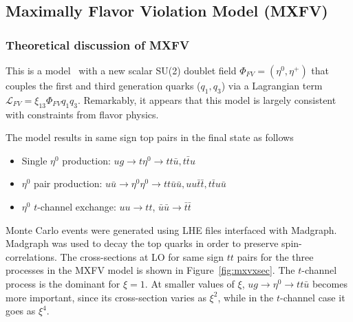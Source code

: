 



\subsection{Maximally Flavor Violation Model (MXFV)}
\label{sec:mxfv}

\subsubsection{Theoretical discussion of MXFV}
\label{sec:mxfvtheory}

This is a model~\cite{mxflv1,mxflv2,mxflv3} with a new scalar 
SU(2) doublet field $\Phi_{FV} = (\eta^0,\eta^+)$ that couples the first and third 
generation quarks ($q_1,q_3$) via a Lagrangian term 
$\mathcal{L}_{FV} = \xi_{13} \Phi_{FV} q_1 q_3$.  Remarkably, it appears that this
model is largely consistent with constraints from flavor physics.

The model results in same sign top pairs in the final state as follows
\begin{itemize}

\item Single $\eta^0$ production: $ug \to t\eta^0 \to tt\bar{u}, t\bar{t}u$

\item $\eta^0$ pair production: $u \bar{u} \to \eta^0 \eta^0 \to tt\bar{u}\bar{u},
uu\bar{t}\bar{t}, t\bar{t}u\bar{u}$

\item $\eta^0$ $t$-channel exchange: $uu \to tt$, $\bar{u}\bar{u} \to \bar{t}\bar{t}$
\end{itemize}

Monte Carlo events were generated using LHE files\cite{simplifiedModel} interfaced 
with Madgraph.  Madgraph was used to decay the top quarks in order to preserve 
spin-correlations.  The cross-sections at LO for same sign $tt$ pairs for the three
processes in the MXFV model is shown in Figure~\ref{fig:mxvxsec}.  The $t$-channel
process is the dominant for $\xi = 1$.  At smaller values of $\xi$, 
$ug \to \eta^0 \to tt\bar{u}$ becomes more important, since its cross-section 
varies as $\xi^2$, while in the $t$-channel case it goes as $\xi^4$.


